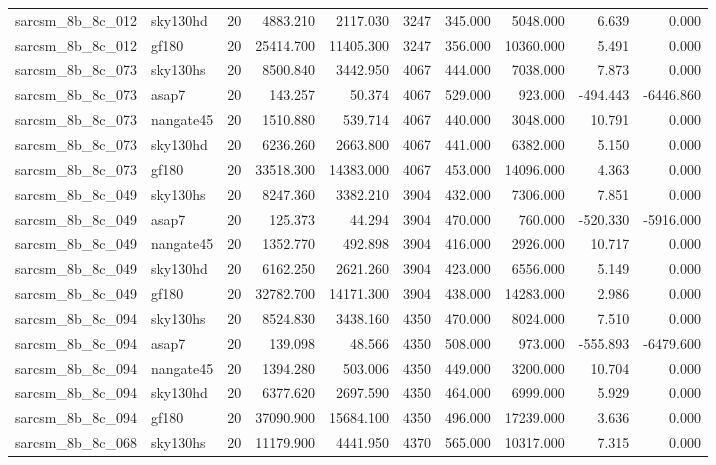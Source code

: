 \begin{longtable}{llrrrrrrrr}
sarcsm\_8b\_8c\_012 & sky130hd & 20 & 4883.210 & 2117.030 & 3247 & 345.000 & 5048.000 & 6.639 & 0.000 \\
sarcsm\_8b\_8c\_012 & gf180 & 20 & 25414.700 & 11405.300 & 3247 & 356.000 & 10360.000 & 5.491 & 0.000 \\
sarcsm\_8b\_8c\_073 & sky130hs & 20 & 8500.840 & 3442.950 & 4067 & 444.000 & 7038.000 & 7.873 & 0.000 \\
sarcsm\_8b\_8c\_073 & asap7 & 20 & 143.257 & 50.374 & 4067 & 529.000 & 923.000 & -494.443 & -6446.860 \\
sarcsm\_8b\_8c\_073 & nangate45 & 20 & 1510.880 & 539.714 & 4067 & 440.000 & 3048.000 & 10.791 & 0.000 \\
sarcsm\_8b\_8c\_073 & sky130hd & 20 & 6236.260 & 2663.800 & 4067 & 441.000 & 6382.000 & 5.150 & 0.000 \\
sarcsm\_8b\_8c\_073 & gf180 & 20 & 33518.300 & 14383.000 & 4067 & 453.000 & 14096.000 & 4.363 & 0.000 \\
sarcsm\_8b\_8c\_049 & sky130hs & 20 & 8247.360 & 3382.210 & 3904 & 432.000 & 7306.000 & 7.851 & 0.000 \\
sarcsm\_8b\_8c\_049 & asap7 & 20 & 125.373 & 44.294 & 3904 & 470.000 & 760.000 & -520.330 & -5916.000 \\
sarcsm\_8b\_8c\_049 & nangate45 & 20 & 1352.770 & 492.898 & 3904 & 416.000 & 2926.000 & 10.717 & 0.000 \\
sarcsm\_8b\_8c\_049 & sky130hd & 20 & 6162.250 & 2621.260 & 3904 & 423.000 & 6556.000 & 5.149 & 0.000 \\
sarcsm\_8b\_8c\_049 & gf180 & 20 & 32782.700 & 14171.300 & 3904 & 438.000 & 14283.000 & 2.986 & 0.000 \\
sarcsm\_8b\_8c\_094 & sky130hs & 20 & 8524.830 & 3438.160 & 4350 & 470.000 & 8024.000 & 7.510 & 0.000 \\
sarcsm\_8b\_8c\_094 & asap7 & 20 & 139.098 & 48.566 & 4350 & 508.000 & 973.000 & -555.893 & -6479.600 \\
sarcsm\_8b\_8c\_094 & nangate45 & 20 & 1394.280 & 503.006 & 4350 & 449.000 & 3200.000 & 10.704 & 0.000 \\
sarcsm\_8b\_8c\_094 & sky130hd & 20 & 6377.620 & 2697.590 & 4350 & 464.000 & 6999.000 & 5.929 & 0.000 \\
sarcsm\_8b\_8c\_094 & gf180 & 20 & 37090.900 & 15684.100 & 4350 & 496.000 & 17239.000 & 3.636 & 0.000 \\
sarcsm\_8b\_8c\_068 & sky130hs & 20 & 11179.900 & 4441.950 & 4370 & 565.000 & 10317.000 & 7.315 & 0.000 \\

\end{longtable}
